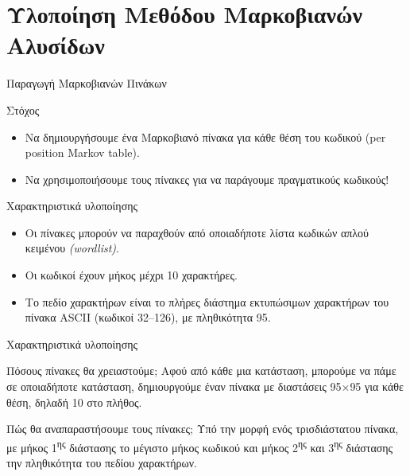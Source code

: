 \documentclass[10pt]{beamer}
\begin{document}
\section{Υλοποίηση Μεθόδου Μαρκοβιανών Αλυσίδων}
\begin{frame}{Παραγωγή Μαρκοβιανών Πινάκων}
    \begin{block}{Στόχος}
        \begin{itemize}
            \item Να δημιουργήσουμε ένα Μαρκοβιανό πίνακα για κάθε θέση του κωδικού (per position Markov table).
            \item Να χρησιμοποιήσουμε τους πίνακες για να παράγουμε πραγματικούς κωδικούς!
        \end{itemize}
    \end{block}
    \pause
    \begin{block}{Χαρακτηριστικά υλοποίησης}
        \begin{itemize}
            \item Οι πίνακες μπορούν να παραχθούν από οποιαδήποτε λίστα κωδικών απλού κειμένου \textit{(wordlist)}.
            \item Οι κωδικοί έχουν μήκος μέχρι 10 χαρακτήρες.
            \item Το πεδίο χαρακτήρων είναι το πλήρες διάστημα εκτυπώσιμων χαρακτήρων του πίνακα ASCII (κωδικοί 32--126), με πληθικότητα 95.
        \end{itemize}
    \end{block}
\end{frame}

\begin{frame}{Χαρακτηριστικά υλοποίησης}
    \begin{block}{Πόσους πίνακες θα χρειαστούμε;}
        Αφού από κάθε μια κατάσταση, μπορούμε να πάμε σε οποιαδήποτε κατάσταση, δημιουργούμε έναν πίνακα με διαστάσεις 95$\times$95 για κάθε θέση, δηλαδή 10 στο πλήθος.
    \end{block}
    \pause
    \begin{block}{Πώς θα αναπαραστήσουμε τους πίνακες;}
        Υπό την μορφή ενός τρισδιάστατου πίνακα, με μήκος 1\textsuperscript{ης} διάστασης το μέγιστο μήκος κωδικού και μήκος 2\textsuperscript{ης} και 3\textsuperscript{ης} διάστασης την πληθικότητα του πεδίου χαρακτήρων.
    \end{block}
\end{frame}
\end{document}
